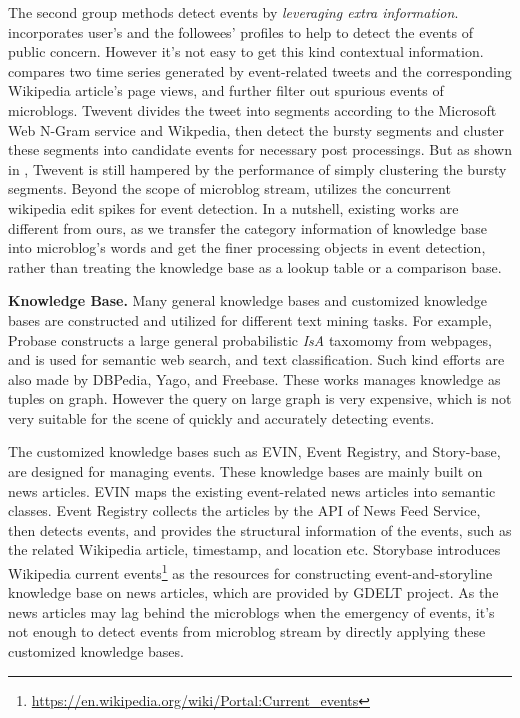 \documentclass[runningheads,a4paper]{llncs}
\theoremstyle{exampstyle}
\begin{document}
The second group methods detect events by \textit{leveraging extra information}. 
\cite{huang2016efficient} incorporates user's and the followees' profiles to help to detect the events of public concern. 
However it's not easy to get this kind contextual information.
\cite{osborne2012bieber} compares two time series generated by event-related tweets and the corresponding Wikipedia article's page views, and further filter out spurious events of microblogs.
Twevent \cite{Twevent2012} divides the tweet into segments according to the Microsoft Web N-Gram service and Wikpedia, then detect the bursty segments and cluster these segments into candidate events for necessary post processings.
But as shown in \cite{Yan:2015wm}, Twevent is still hampered by the performance of simply clustering the bursty segments.
Beyond the scope of microblog stream, \cite{steiner2013mj} utilizes the concurrent wikipedia edit spikes for event detection.
In a nutshell, existing works are different from ours, as we transfer the category information of knowledge base into microblog's words and get the finer processing objects in event detection, rather than treating the knowledge base as a lookup table or a comparison base.

\textbf{Knowledge Base.} Many general knowledge bases and customized knowledge bases are constructed and utilized for different text mining tasks. 
For example, Probase\cite{wu2012probase} constructs a large general probabilistic \textit{IsA} taxomomy from webpages, and is used for semantic web search, and text classification\cite{wang2014concept}.
Such kind efforts are also made by DBPedia\cite{auer2007dbpedia}, Yago\cite{fabian2007yago}, and Freebase\cite{bollacker2008freebase}. 
These works manages knowledge as tuples on graph. 
However the query on large graph is very expensive\cite{huang2011scalable}, which is not very suitable for the scene of quickly and accurately detecting events.

The customized knowledge bases such as EVIN\cite{kuzey2014evin}, Event Registry\cite{leban2014eventRegistry}, and Story-base\cite{wu2015storybase}, are designed for managing events.
These knowledge bases are mainly built on news articles.
EVIN maps the existing event-related news articles into semantic classes. 
Event Registry collects the articles by the API of News Feed Service\cite{trampuvs2012newsfeed}, then detects events, and provides the structural information of the events, such as the related Wikipedia article, timestamp, and location etc. 
Storybase introduces Wikipedia current events\footnote{\url{https://en.wikipedia.org/wiki/Portal:Current_events}} as the resources for constructing event-and-storyline knowledge base on news articles, which are provided by GDELT project\cite{leetaru2013gdelt}.
As the news articles may lag behind the microblogs when the emergency of events, it's not enough to detect events from microblog stream by directly applying these customized knowledge bases. 
\end{document}
